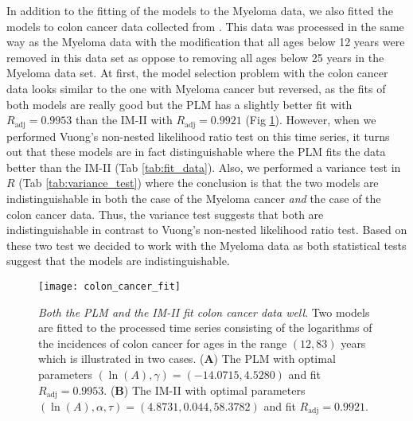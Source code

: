 In addition to the fitting of the models to the Myeloma data, we also fitted the models to colon cancer data collected from \cite{Palmer1883,SEER}. This data was processed in the same way as the Myeloma data with the modification that all ages below 12 years were removed in this data set as oppose to removing all ages below 25 years in the Myeloma data set. At first, the model selection problem with the colon cancer data looks similar to the one with Myeloma cancer but reversed, as the fits of both models are really good but the PLM has a slightly better fit with $R_{\mathrm{adj}}=0.9953$ than the IM-II with $R_{\mathrm{adj}}=0.9921$ (Fig \ref{fig:colon}). However, when we performed Vuong's non-nested likelihood ratio test \cite{Vuong1989} on this time series, it turns out that these models are in fact distinguishable where the PLM fits the data better than the IM-II (Tab \ref{tab:fit_data}). Also, we performed a variance test in $R$ (Tab \ref{tab:variance_test}) where the conclusion is that the two models are indistinguishable in both the case of the Myeloma cancer \textit{and} the case of the colon cancer data. Thus, the variance test suggests that both are indistinguishable in contrast to Vuong's non-nested likelihood ratio test. Based on these two test we decided to work with the Myeloma data as both statistical tests suggest that the models are indistinguishable.  




\begin{figure}[htbp!]
  \texttt{[image: colon\_cancer\_fit]}
  \caption[Both the PLM and the IM-II fit colon cancer data well]{\textit{Both the PLM and the IM-II fit colon cancer data well}. Two models are fitted to the processed time series consisting of the logarithms of the incidences of colon cancer for ages in the range $(12, 83)$ years which is illustrated in two cases. (\textbf{A}) The PLM with optimal parameters $(\ln(A),\gamma)=(-14.0715,4.5280)$ and fit $R_{\mathrm{adj}}=0.9953$. (\textbf{B}) The IM-II with optimal parameters $(\ln(A),\alpha,\tau )=(4.8731,0.044,58.3782)$ and fit $R_{\mathrm{adj}}=0.9921$.}
  \label{fig:colon}
\end{figure}





